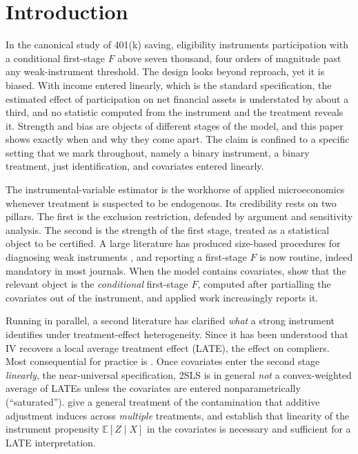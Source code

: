 \documentclass[11pt]{article}
\theoremstyle{plain}
\theoremstyle{definition}
\newcommand{\E}{\mathbb{E}}
\begin{document}
\section{Introduction}

In the canonical study of 401(k) saving, eligibility instruments participation with a conditional first-stage $F$ above seven thousand, four orders of magnitude past any weak-instrument threshold. The design looks beyond reproach, yet it is biased. With income entered linearly, which is the standard specification, the estimated effect of participation on net financial assets is understated by about a third, and no statistic computed from the instrument and the treatment reveals it. Strength and bias are objects of different stages of the model, and this paper shows exactly when and why they come apart. The claim is confined to a specific setting that we mark throughout, namely a binary instrument, a binary treatment, just identification, and covariates entered linearly.

The instrumental-variable estimator is the workhorse of applied microeconomics whenever treatment is suspected to be endogenous. Its credibility rests on two pillars. The first is the exclusion restriction, defended by argument and sensitivity analysis. The second is the strength of the first stage, treated as a statistical object to be certified. A large literature has produced size-based procedures for diagnosing weak instruments \citep{staigerstock1997,stockyogo2005,mop2013,assw2019}, and reporting a first-stage $F$ is now routine, indeed mandatory in most journals. When the model contains covariates, \citet{sw2016} show that the relevant object is the \emph{conditional} first-stage $F$, computed after partialling the covariates out of the instrument, and applied work increasingly reports it.

Running in parallel, a second literature has clarified \emph{what} a strong instrument identifies under treatment-effect heterogeneity. Since \citet{imbensangrist1994} it has been understood that IV recovers a local average treatment effect (LATE), the effect on compliers. Most consequential for practice is \citet{blandhol2022}. Once covariates enter the second stage \emph{linearly}, the near-universal specification, 2SLS is in general \emph{not} a convex-weighted average of LATEs unless the covariates are entered nonparametrically (``saturated''). \citet{gpi2024} give a general treatment of the contamination that additive adjustment induces across \emph{multiple} treatments, and \citet{zhao2025} establish that linearity of the instrument propensity $\E[Z\mid X]$ in the covariates is necessary and sufficient for a LATE interpretation.
\end{document}
